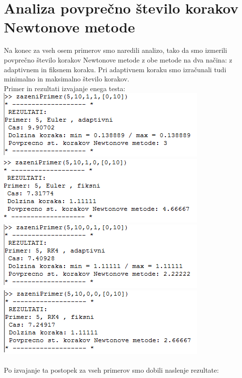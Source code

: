 \documentclass[]{article}
\begin{document}
\section{Analiza povpre\v{c}no \v{s}tevilo korakov Newtonove metode} 
Na konec za vseh osem primerov smo naredili analizo, tako da smo izmerili povpre\v{c}no \v{s}tevilo korakov Newtonove metode z obe metode na dva na\v{c}ina: z adaptivnem in fiksnem koraku. Pri adaptivnem koraku smo izra\v{c}unali tudi minimalno in maksimalno \v{s}tevilo korakov. \\
Primer in rezultati izvajanje enega testa: \\
	\includegraphics[scale=0.8]{a1}
	\includegraphics[scale=0.8]{a2}
	\includegraphics[scale=0.8]{a3}
	\includegraphics[scale=0.8]{a4} \\ \\
Po izvajanje ta postopek za vseh primerov smo dobili naslenje rezultate: \\
\end{document}
